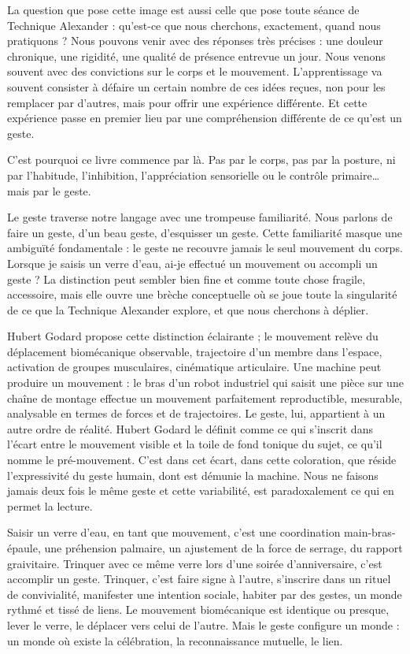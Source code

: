 \documentclass[
  french,
  letterpaper,
  DIV=11,
  numbers=noendperiod]{scrreprt}
\begin{document}
La question que pose cette image est aussi celle que pose toute séance
de Technique Alexander : qu'est-ce que nous cherchons, exactement, quand
nous pratiquons ? Nous pouvons venir avec des réponses très précises :
une douleur chronique, une rigidité, une qualité de présence entrevue un
jour. Nous venons souvent avec des convictions sur le corps et le
mouvement. L'apprentissage va souvent consister à défaire un certain
nombre de ces idées reçues, non pour les remplacer par d'autres, mais
pour offrir une expérience différente. Et cette expérience passe en
premier lieu par une compréhension différente de ce qu'est un geste.

C'est pourquoi ce livre commence par là. Pas par le corps, pas par la
posture, ni par l'habitude, l'inhibition, l'appréciation sensorielle ou
le contrôle primaire\ldots{} mais par le geste.

Le geste traverse notre langage avec une trompeuse familiarité. Nous
parlons de faire un geste, d'un beau geste, d'esquisser un geste. Cette
familiarité masque une ambiguïté fondamentale : le geste ne recouvre
jamais le seul mouvement du corps. Lorsque je saisis un verre d'eau,
ai-je effectué un mouvement ou accompli un geste ? La distinction peut
sembler bien fine et comme toute chose fragile, accessoire, mais elle
ouvre une brèche conceptuelle où se joue toute la singularité de ce que
la Technique Alexander explore, et que nous cherchons à déplier.

Hubert Godard propose cette distinction éclairante ; le mouvement relève
du déplacement biomécanique observable, trajectoire d'un membre dans
l'espace, activation de groupes musculaires, cinématique articulaire.
Une machine peut produire un mouvement : le bras d'un robot industriel
qui saisit une pièce sur une chaîne de montage effectue un mouvement
parfaitement reproductible, mesurable, analysable en termes de forces et
de trajectoires. Le geste, lui, appartient à un autre ordre de réalité.
Hubert Godard le définit comme ce qui s'inscrit dans l'écart entre le
mouvement visible et la toile de fond tonique du sujet, ce qu'il nomme
le pré-mouvement. C'est dans cet écart, dans cette coloration, que
réside l'expressivité du geste humain, dont est démunie la machine. Nous
ne faisons jamais deux fois le même geste et cette variabilité, est
paradoxalement ce qui en permet la lecture.~

Saisir un verre d'eau, en tant que mouvement, c'est une coordination
main-bras-épaule, une préhension palmaire, un ajustement de la force de
serrage, du rapport graivitaire. Trinquer avec ce même verre lors d'une
soirée d'anniversaire, c'est accomplir un geste. Trinquer, c'est faire
signe à l'autre, s'inscrire dans un rituel de convivialité, manifester
une intention sociale, habiter par des gestes, un monde rythmé et tissé
de liens. Le mouvement biomécanique est identique ou presque, lever le
verre, le déplacer vers celui de l'autre. Mais le geste configure un
monde : un monde où existe la célébration, la reconnaissance mutuelle,
le lien.
\end{document}
